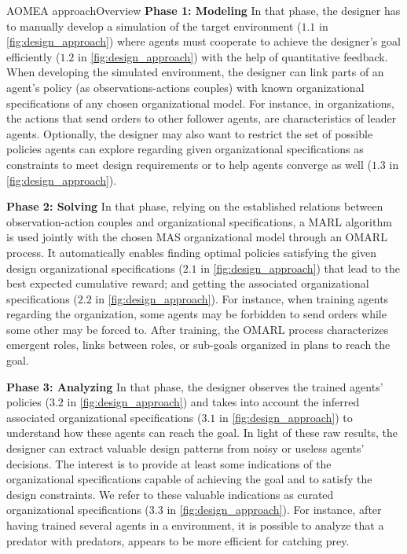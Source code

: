 \begin{frame}{AOMEA approach}{Overview}
    \textbf{Phase 1: Modeling} \quad In that phase, the designer has to manually develop a simulation of the target environment ($1.1$ in \autoref{fig:design_approach}) where agents must cooperate to achieve the designer's goal efficiently ($1.2$ in \autoref{fig:design_approach}) with the help of quantitative feedback. When developing the simulated environment, the designer can link parts of an agent's policy (as observations-actions couples) with known organizational specifications of any chosen organizational model.
    For instance, in  organizations, the actions that send orders to other follower agents, are characteristics of leader agents.
    Optionally, the designer may also want to restrict the set of possible policies agents can explore regarding given organizational specifications as constraints to meet design requirements or to help agents converge as well ($1.3$ in \autoref{fig:design_approach}).

    \textbf{Phase 2: Solving} \quad In that phase, relying on the established relations between observation-action couples and organizational specifications, a MARL algorithm is used jointly with the chosen MAS organizational model through an OMARL process. It automatically enables finding optimal policies satisfying the given design organizational specifications ($2.1$ in \autoref{fig:design_approach}) that lead to the best expected cumulative reward; and getting the associated organizational specifications ($2.2$ in \autoref{fig:design_approach}). For instance, when training agents regarding the  organization, some agents may be forbidden to send orders while some other may be forced to. After training, the OMARL process characterizes emergent roles, links between roles, or sub-goals organized in plans to reach the goal.

    \textbf{Phase 3: Analyzing} \quad In that phase, the designer observes the trained agents' policies ($3.2$ in \autoref{fig:design_approach}) and takes into account the inferred associated organizational specifications ($3.1$ in \autoref{fig:design_approach}) to understand how these agents can reach the goal. In light of these raw results, the designer can extract valuable design patterns from noisy or useless agents' decisions. The interest is to provide at least some indications of the organizational specifications capable of achieving the goal and to satisfy the design constraints. We refer to these valuable indications as curated organizational specifications ($3.3$ in \autoref{fig:design_approach}). For instance, after having trained several agents in a  environment, it is possible to analyze that a  predator with  predators, appears to be more efficient for catching prey.


\end{frame}
